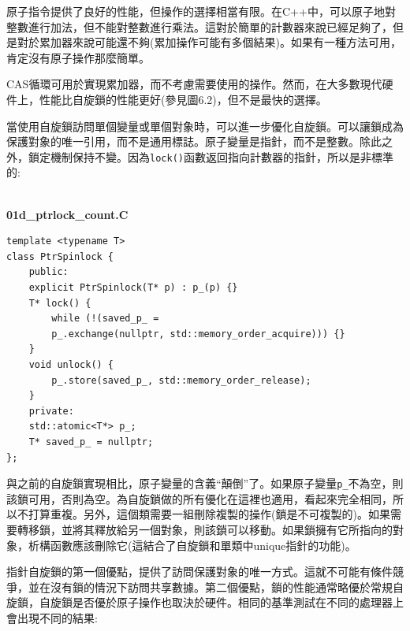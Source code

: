 原子指令提供了良好的性能，但操作的選擇相當有限。在C++中，可以原子地對整數進行加法，但不能對整數進行乘法。這對於簡單的計數器來說已經足夠了，但是對於累加器來說可能還不夠(累加操作可能有多個結果)。如果有一種方法可用，肯定沒有原子操作那麼簡單。

CAS循環可用於實現累加器，而不考慮需要使用的操作。然而，在大多數現代硬件上，性能比自旋鎖的性能更好(參見圖6.2)，但不是最快的選擇。

當使用自旋鎖訪問單個變量或單個對象時，可以進一步優化自旋鎖。可以讓鎖成為保護對象的唯一引用，而不是通用標誌。原子變量是指針，而不是整數。除此之外，鎖定機制保持不變。因為\texttt{lock()}函數返回指向計數器的指針，所以是非標準的:

\hspace*{\fill} \\ %
\noindent
\textbf{01d\_ptrlock\_count.C}
\begin{lstlisting}[style=styleCXX]
template <typename T>
class PtrSpinlock {
	public:
	explicit PtrSpinlock(T* p) : p_(p) {}
	T* lock() {
		while (!(saved_p_ =
		p_.exchange(nullptr, std::memory_order_acquire))) {}
	}
	void unlock() {
		p_.store(saved_p_, std::memory_order_release);
	}
	private:
	std::atomic<T*> p_;
	T* saved_p_ = nullptr;
};
\end{lstlisting}

與之前的自旋鎖實現相比，原子變量的含義“顛倒”了。如果原子變量\texttt{p\_}不為空，則該鎖可用，否則為空。為自旋鎖做的所有優化在這裡也適用，看起來完全相同，所以不打算重複。另外，這個類需要一組刪除複製的操作(鎖是不可複製的)。如果需要轉移鎖，並將其釋放給另一個對象，則該鎖可以移動。如果鎖擁有它所指向的對象，析構函數應該刪除它(這結合了自旋鎖和單類中unique指針的功能)。

指針自旋鎖的第一個優點，提供了訪問保護對象的唯一方式。這就不可能有條件競爭，並在沒有鎖的情況下訪問共享數據。第二個優點，鎖的性能通常略優於常規自旋鎖，自旋鎖是否優於原子操作也取決於硬件。相同的基準測試在不同的處理器上會出現不同的結果:


